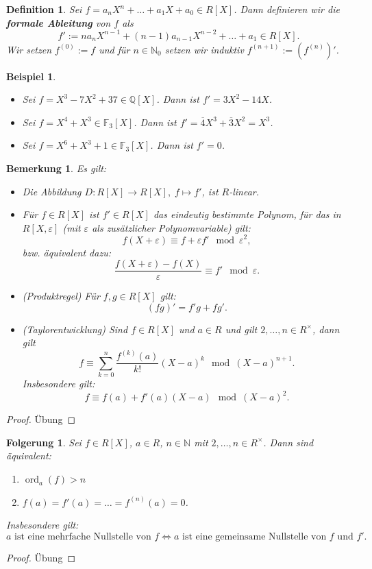 \documentclass[a4paper, twoside, 11pt, ngerman]{report}
\newcommand{\FF}{\mathds F}
\newcommand{\NN}{\mathds N}
\newcommand{\QQ}{\mathds Q}
\DeclareMathOperator{\ord}{ord}
\theoremstyle{definistyle}
\newtheorem{defini}[satz]{Definition}
\newtheorem{bem}[satz]{Bemerkung}
\newtheorem{folgerung}[satz]{Folgerung}
\newtheorem{bsp}[satz]{Beispiel}
\theoremstyle{remark}
\newcommand{\defn}[1]{\textit{\bfseries #1}}
\begin{document}
\begin{defini}\label{def:formale_ableitung}
Sei $f = a_n X^n + \ldots + a_1 X + a_0 \in R[X]$. Dann definieren wir die \defn{formale Ableitung} von $f$ als
\[
f' := n a_n X^{n-1} + (n-1) a_{n-1} X^{n-2} + \ldots + a_1\in R[X].
\]
Wir setzen $f^{(0)}:=f$ und für $n\in\NN_0$ setzen wir induktiv $f^{(n+1)}:=(f^{(n)})'$.
\end{defini}

\begin{bsp}\label{bsp:ableitung_beispiele}
\begin{itemize}
    \item[(a)] Sei $f = X^3 - 7X^2 + 37 \in \QQ[X]$. Dann ist $f' = 3X^2 - 14X$.
    \item[(b)] Sei $f = X^4 + X^3 \in \FF_3[X]$. Dann ist $f' = \overline{4}X^3 + \overline{3}X^2 = X^3$.
    \item[(c)] Sei $f = X^6 + X^3 + 1 \in \FF_3[X]$. Dann ist $f' = 0$.
\end{itemize}
\end{bsp}


\begin{bem}\label{bem:formale_ableitung}
Es gilt:
\begin{itemize}
    \item[(a)] Die Abbildung $D \colon R[X] \to R[X], \; f \mapsto f'$, ist $R$-linear.
    \item[(b)] Für $f \in R[X]$ ist $f' \in R[X]$ das eindeutig bestimmte Polynom, für das in $R[X, \varepsilon]$ (mit $\varepsilon$ als zusätzlicher Polynomvariable) gilt:
    \[
    f(X + \varepsilon) \equiv f + \varepsilon f' \mod \varepsilon^2,
    \]
    bzw. äquivalent dazu:
    \[
    \frac{f(X + \varepsilon) - f(X)}{\varepsilon} \equiv f' \mod \varepsilon.
    \]    
    \item[(c)] (Produktregel) Für $f, g \in R[X]$ gilt:
    \[
    (f g)' = f' g + f g'.
    \]
    \item[(d)] (Taylorentwicklung) Sind $f\in R[X]$ und $a \in R$ und gilt $2,\ldots,n\in R^\times$, dann gilt
    \[
    f \equiv \sum_{k=0}^n \frac{f^{(k)}(a)}{k!} (X - a)^k \mod (X - a)^{n+1}.
    \]
    Insbesondere gilt:
    \[
    f\equiv f(a)+f'(a)(X-a) \mod (X-a)^2.
    \]
\end{itemize}
\end{bem}
\begin{proof}
Übung
\end{proof}

\begin{folgerung}\label{bem:nullstellen_und_ableitungen}
Sei $f \in R[X]$, $a \in R$, $n \in \NN$ mit $2,\ldots,n\in R^\times$.
Dann sind äquivalent:
\begin{enumerate}
\item [(i)] $\ord_a(f) > n$
\item [(ii)] $f(a) = f'(a) = \ldots = f^{(n)}(a) = 0$.
\end{enumerate}
Insbesondere gilt:
\[
a \text{ ist eine mehrfache Nullstelle von } f \iff a \text{ ist eine gemeinsame Nullstelle von } f \text{ und } f'.
\]
\end{folgerung}
\begin{proof}
Übung
\end{proof}
\end{document}
